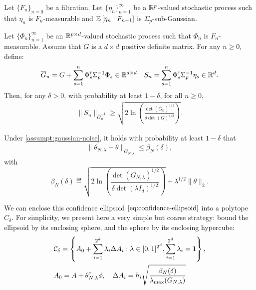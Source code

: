 \documentclass{article}
\begin{document}
\begin{proposition}
\label{prop:concentration}
Let $\{F_n\}_{n=0}$ be a filtration.
Let $\{\eta_n\}_{n=1}^\infty$ be a $\mathbb{R}^p$-valued stochastic process such that $\eta_n$ is $F_n$-measurable and $\operatorname*{\mathbb{E}}\left[\eta_n\;\middle|\; F_{n-1}\right]$ is $\Sigma_p$-sub-Gaussian.

Let $\{\Phi_n\}_{n=1}^\infty$ be an $\mathbb{R}^{p\times d}$-valued stochastic process such that $\Phi_n$ is $F_n$-measurable. Assume that $G$ is a $d\times d$ positive definite matrix. For any $n\geq 0$, define:
\begin{equation*}
    \overline{G}_n = G + \sum_{s=1}^n \Phi_s^{\mathsf{\scriptscriptstyle T}} \Sigma_p^{-1} \Phi_s \in \mathbb{R}^{d\times d} \quad S_n = \sum_{s=1}^n \Phi_s^{\mathsf{\scriptscriptstyle T}}\Sigma_p^{-1}\eta_s \in \mathbb{R}^{d}.
\end{equation*}
Then, for any $\delta>0$, with probability at least $1-\delta$, for all $n\geq0$,
\begin{align*}
\| S_n \|_{\overline{G}_n^{-1}} \geq \sqrt{2\ln \left(\frac{\det\left(\overline{G}_n\right)^{1/2}}{\delta\det(G)^{1/2}}\right)}.
\end{align*}
\end{proposition}

\begin{theorem}
Under \autoref{assumpt:gaussian-noise}, it holds with probability at least $1-\delta$ that
\begin{align}
    \label{eq:confidence-ellipsoid}
    \| \theta_{N,\lambda}  - \theta\|_{G_{N,\lambda}} \leq \beta_N(\delta),
\end{align}
with
\begin{equation}
    \beta_N(\delta)\eqdef \sqrt{2\ln \left(\frac{\det(G_{N,\lambda})^{1/2}}{\delta\det(\lambda I_d)^{1/2}}\right)}
     + \lambda^{1/2}\|\theta\|_2.
\end{equation}
\label{thm:confidence_ellipsoid}
\end{theorem}

We can enclose this confidence ellipsoid $\eqref{eq:confidence-ellipsoid}$ into a polytope $C_\delta$. For simplicity, we present here a very simple but coarse strategy: bound the ellipsoid by its enclosing sphere, and the sphere by its enclosing hypercube:
\begin{align}
    \label{eq:generic-polytope}
     &\mathcal{C}_\delta = \left\{ A_{0}+\sum_{i=1}^{2^d}\lambda_{i}\Delta A_{i}: \lambda\in[0, 1]^{2^d},  \sum_{i=1}^{2^d}\lambda_{i}=1\right\},\\
     &A_0 = A + \theta_{N,\lambda}^{\mathsf{\scriptscriptstyle T}}\phi, \quad\Delta A_{i} = h_i \sqrt{\frac{\beta_N(\delta)}{\lambda_{\max}(G_{N,\lambda})}}
\end{align}
\end{document}
